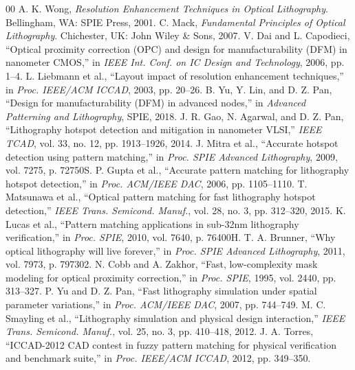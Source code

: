 \documentclass[11pt,journal,onecolumn]{IEEEtran}
\begin{document}
\begin{thebibliography}{00}
 A. K. Wong, \textit{Resolution Enhancement Techniques in Optical Lithography}. Bellingham, WA: SPIE Press, 2001.
 C. Mack, \textit{Fundamental Principles of Optical Lithography}. Chichester, UK: John Wiley \& Sons, 2007.
 V. Dai and L. Capodieci, ``Optical proximity correction (OPC) and design for manufacturability (DFM) in nanometer CMOS,'' in \textit{IEEE Int. Conf. on IC Design and Technology}, 2006, pp. 1--4.
 L. Liebmann et al., ``Layout impact of resolution enhancement techniques,'' in \textit{Proc. IEEE/ACM ICCAD}, 2003, pp. 20--26.
 B. Yu, Y. Lin, and D. Z. Pan, ``Design for manufacturability (DFM) in advanced nodes,'' in \textit{Advanced Patterning and Lithography}, SPIE, 2018.
 J. R. Gao, N. Agarwal, and D. Z. Pan, ``Lithography hotspot detection and mitigation in nanometer VLSI,'' \textit{IEEE TCAD}, vol. 33, no. 12, pp. 1913--1926, 2014.
 J. Mitra et al., ``Accurate hotspot detection using pattern matching,'' in \textit{Proc. SPIE Advanced Lithography}, 2009, vol. 7275, p. 72750S.
 P. Gupta et al., ``Accurate pattern matching for lithography hotspot detection,'' in \textit{Proc. ACM/IEEE DAC}, 2006, pp. 1105--1110.
 T. Matsunawa et al., ``Optical pattern matching for fast lithography hotspot detection,'' \textit{IEEE Trans. Semicond. Manuf.}, vol. 28, no. 3, pp. 312--320, 2015.
 K. Lucas et al., ``Pattern matching applications in sub-32nm lithography verification,'' in \textit{Proc. SPIE}, 2010, vol. 7640, p. 76400H.
 T. A. Brunner, ``Why optical lithography will live forever,'' in \textit{Proc. SPIE Advanced Lithography}, 2011, vol. 7973, p. 797302.
 N. Cobb and A. Zakhor, ``Fast, low-complexity mask modeling for optical proximity correction,'' in \textit{Proc. SPIE}, 1995, vol. 2440, pp. 313--327.
 P. Yu and D. Z. Pan, ``Fast lithography simulation under spatial parameter variations,'' in \textit{Proc. ACM/IEEE DAC}, 2007, pp. 744--749.
 M. C. Smayling et al., ``Lithography simulation and physical design interaction,'' \textit{IEEE Trans. Semicond. Manuf.}, vol. 25, no. 3, pp. 410--418, 2012.
 J. A. Torres, ``ICCAD-2012 CAD contest in fuzzy pattern matching for physical verification and benchmark suite,'' in \textit{Proc. IEEE/ACM ICCAD}, 2012, pp. 349--350.

\end{thebibliography}
\end{document}
